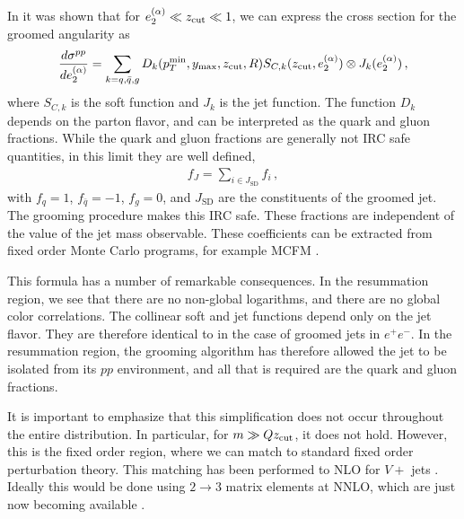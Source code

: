 In  it was shown that for $e_{2}^{(\alpha)} \ll z_{\rm cut} \ll 1$,  we can express the cross section for the groomed angularity as
\begin{align}\label{eq:fac_pp_e2}
\frac{d\sigma^{pp}}{de_{2}^{(\alpha)}}=\sum\limits_{k=q,\bar q, g}D_k(p_T^{\text{min}}, y_\text{max}, z_{\rm cut}, R) S_{C,k}(z_{\rm cut}, e_{2}^{(\alpha)})\otimes J_k (e_{2}^{(\alpha)})\,,
\end{align}
\noindent where $S_{C,k}$ is the soft function and $J_k$ is the jet function.  The function $D_k$ depends on the parton flavor, and can be interpreted as the quark and gluon fractions. While the quark and gluon fractions are generally not IRC safe quantities, in this limit they are well defined, 
\begin{align}
f_J=\sum\limits_{i\in J_{\text{SD}}} f_i\,,
\end{align}
with $f_q=1$, $f_{\bar q}=-1$, $f_g=0$, and $J_{\text{SD}}$ are the constituents of the groomed jet. The grooming procedure makes this IRC safe. These fractions are independent of the value of the jet mass observable. These coefficients can be extracted from fixed order Monte Carlo programs, for example MCFM \cite{Campbell:1999ah,Campbell:2010ff,Campbell:2011bn}.



This formula has a number of remarkable consequences. In the resummation region, we see that there are no non-global logarithms, and there are no global color correlations. The collinear soft and jet functions depend only on the jet flavor. They are therefore identical to in the case of groomed jets in $e^+e^-$. In the resummation region, the grooming algorithm has therefore allowed the jet to be isolated from its $pp$ environment, and all that is required are the quark and gluon fractions. 


It is important to emphasize that this simplification does not occur
throughout the entire distribution. In particular, for $m \gg Qz_{\rm cut}$,
it does not hold. However, this is the fixed order region, where we
can match to standard fixed order perturbation theory. This matching
has been performed to NLO for $V+$ jets
\cite{Frye:2016aiz,Marzani:2017kqd,Marzani:2017mva} .  Ideally this would be done using $2\to 3$ matrix
elements at NNLO, which are just now becoming available
\cite{Gehrmann:2015bfy,Dunbar:2016aux,Badger:2013yda,Badger:2017jhb,Abreu:2017hqn}.




